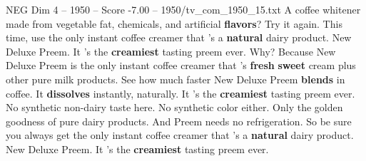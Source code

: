 \begin{textsample}{NEG Dim 4 – 1950 – Score -7.00 – 1950/tv\_com\_1950\_15.txt}  \label{ex:f4_neg_002}
A coffee whitener made from vegetable fat, chemicals, and artificial \textbf{flavors}?
Try it again.
This time, use the only instant coffee creamer that 's a \textbf{natural} dairy product.
New Deluxe Preem.
It 's the \textbf{creamiest} tasting preem ever.
Why?
Because New Deluxe Preem is the only instant coffee creamer that 's \textbf{fresh} \textbf{sweet} cream plus other pure milk products.
See how much faster New Deluxe Preem \textbf{blends} in coffee.
It \textbf{dissolves} instantly, naturally.
It 's the \textbf{creamiest} tasting preem ever.
No synthetic non-dairy taste here.
No synthetic color either.
Only the golden goodness of pure dairy products.
And Preem needs no refrigeration.
So be sure you always get the only instant coffee creamer that 's a \textbf{natural} dairy product.
New Deluxe Preem.
It 's the \textbf{creamiest} tasting preem ever.

\end{textsample}
